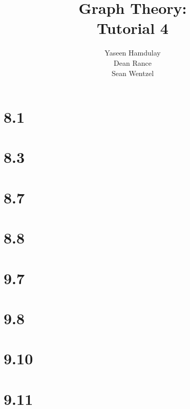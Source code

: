 \documentclass[12pt,a4paper]{article}
\title{{\bf Graph Theory:}\\
Tutorial 4}
\author{Yaseen Hamdulay \\
	Dean Rance \\
	Sean Wentzel}
\newcommand{\q}[1]{
\section*{#1}

}
\begin{document}
\maketitle

\q{8.1}

\q{8.3}

\q{8.7}

\q{8.8}

\q{9.7}

\q{9.8}

\q{9.10}

\q{9.11}


\end{document}

